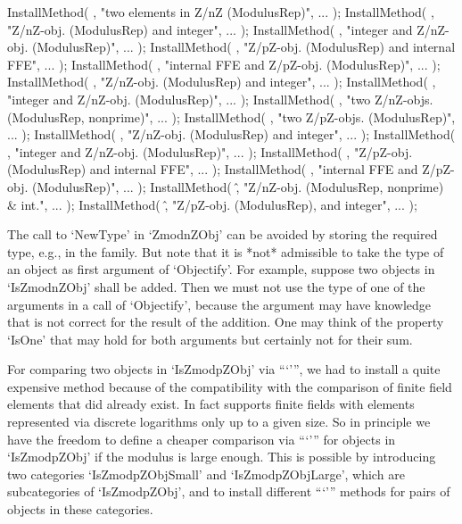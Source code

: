 \begintt
    InstallMethod( \-, "two elements in Z/nZ (ModulusRep)", ... );
    InstallMethod( \-, "Z/nZ-obj. (ModulusRep) and integer", ... );
    InstallMethod( \-, "integer and Z/nZ-obj. (ModulusRep)", ... );
    InstallMethod( \-, "Z/pZ-obj. (ModulusRep) and internal FFE", ... );
    InstallMethod( \-, "internal FFE and Z/pZ-obj. (ModulusRep)", ... );
    InstallMethod( \*, "Z/nZ-obj. (ModulusRep) and integer", ... );
    InstallMethod( \*, "integer and Z/nZ-obj. (ModulusRep)", ... );
    InstallMethod( \/, "two Z/nZ-objs. (ModulusRep, nonprime)", ... );
    InstallMethod( \/, "two Z/pZ-objs. (ModulusRep)", ... );
    InstallMethod( \/, "Z/nZ-obj. (ModulusRep) and integer", ... );
    InstallMethod( \/, "integer and Z/nZ-obj. (ModulusRep)", ... );
    InstallMethod( \/, "Z/pZ-obj. (ModulusRep) and internal FFE", ... );
    InstallMethod( \/, "internal FFE and Z/pZ-obj. (ModulusRep)", ... );
    InstallMethod( \^, "Z/nZ-obj. (ModulusRep, nonprime) & int.", ... );
    InstallMethod( \^, "Z/pZ-obj. (ModulusRep), and integer", ... );
\endtt

The call to `NewType' in `ZmodnZObj' can be avoided by storing
the required type, e.g., in the family.
But note that it is *not* admissible to take the type of an object
as first argument of `Objectify'.
For example, suppose two objects in `IsZmodnZObj' shall be added.
Then we must not use the type of one of the arguments in a call of
`Objectify', because the argument may have knowledge that is not
correct for the result of the addition.
One may think of the property `IsOne' that may hold for both
arguments but certainly not for their sum.

For comparing two objects in `IsZmodpZObj' via ```\<''',
we had to install a quite expensive method because of the compatibility
with the comparison of finite field elements that did already exist.
In fact {\GAP} supports finite fields with elements represented via
discrete logarithms only up to a given size.
So in principle we have the freedom to define a cheaper comparison
via ```\<''' for objects in `IsZmodpZObj' if the modulus is large
enough.
This is possible by introducing two categories `IsZmodpZObjSmall'
and `IsZmodpZObjLarge', which are subcategories of `IsZmodpZObj',
and to install different ```\<''' methods for pairs of objects
in these categories.



